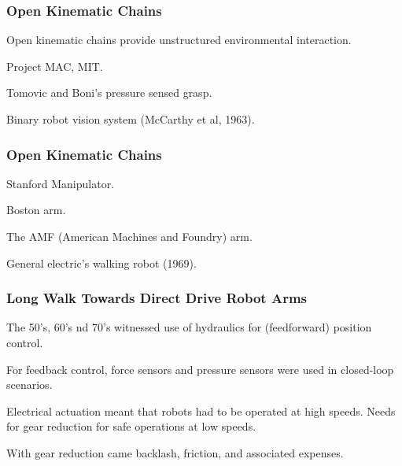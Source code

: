 \begin{frame}
\frametitle{Open Kinematic Chains}
%
\begin{tcolorbox}[coltitle=blue!80!yellow,colframe=brown!80]
	Open kinematic chains provide unstructured environmental interaction.
\end{tcolorbox}
\begin{tcolorbox}[coltitle=blue!80!yellow,colframe=gray!100]
	Project MAC, MIT.
\end{tcolorbox}
\begin{tcolorbox}[coltitle=blue!80!yellow,colframe=black!80]
	Tomovic and Boni's pressure sensed grasp.
\end{tcolorbox}
\begin{tcolorbox}[coltitle=blue!80!yellow,colframe=pink!100]
	Binary robot vision system (McCarthy et al, 1963).
\end{tcolorbox}
\end{frame}

\begin{frame}
\frametitle{Open Kinematic Chains}
%
\begin{tcolorbox}[coltitle=cyan!80,colframe=green!100]
	Stanford Manipulator.
\end{tcolorbox}
\begin{tcolorbox}[coltitle=blue!80!yellow,colframe=blue!100]
	Boston arm.
\end{tcolorbox}
\begin{tcolorbox}[coltitle=blue!80!yellow,colframe=red!100]
	The AMF (American Machines and Foundry) arm.
\end{tcolorbox}
\begin{tcolorbox}[coltitle=blue!80!yellow,colframe=yellow!100]
	General electric's walking robot (1969).
\end{tcolorbox}
\end{frame}


\begin{frame}
\frametitle{Long Walk Towards Direct Drive Robot Arms}

\begin{tcolorbox}[coltitle=magenta!80!green,colframe=yellow!80!green]
	The 50's, 60's nd 70's witnessed use of hydraulics  for (feedforward) position control.
\end{tcolorbox}

\begin{tcolorbox}[coltitle=magenta!80!green,colframe=blue!80!green] 
	For feedback control, force sensors and pressure sensors were used in closed-loop scenarios.
\end{tcolorbox}

\begin{tcolorbox}[coltitle=magenta!80!green,colframe=red!80!green] 
	Electrical actuation meant that robots had to be operated at high speeds. Needs for gear reduction for safe operations at low speeds. 
\end{tcolorbox}

\begin{tcolorbox}[coltitle=magenta!80!green,colframe=brown!80!green]
	With gear reduction came backlash, friction, and associated expenses.
\end{tcolorbox}
\end{frame}


